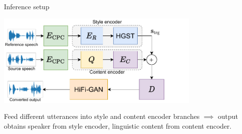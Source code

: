 \documentclass[final]{beamer}
\begin{document}
\begin{frame}[t]
\begin{columns}[T]
\begin{column}{.33\linewidth}
\begin{minipage}[T]{.97\textwidth}
{\begin{block}{Inference setup}
    \vspace{-0.3cm}
    \centerline{\includegraphics[width=0.75\textwidth]{figures/HGST12_inference.pdf}}

        
        
        
    Feed different utterances into style and content encoder branches $\implies$ output obtains speaker from style encoder, linguistic content from content encoder.
\end{block}


        
        
}
\end{minipage}
\end{column}
\end{columns}
\end{frame}
\end{document}
